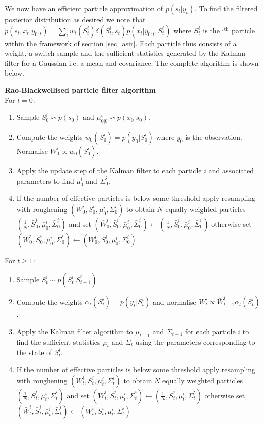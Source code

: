 We now have an efficient particle approximation of $p(s_t|y_t)$. To find the filtered posterior distribution as desired we note that $p(s_t,x_t|y_{0:t}) = \sum_i w_t(S_t^i)\delta(S_t^i, s_t)p(x_t|y_{0:t}, S_t^i)$ where $S_t^i$ is the i$^{\text{th}}$ particle within the framework of section \ref{sec_asir}. Each particle thus consists of a weight, a switch sample and the sufficient statistics generated by the Kalman filter for a Gaussian i.e. a mean and covariance. The complete algorithm is shown below.

\textbf{Rao-Blackwellised particle filter algorithm}\\
For $t=0$:
\begin{enumerate}
\item
Sample $S^i_0 \backsim p(s_0)$ and $\mu_{0|0}^i \backsim p(x_0|s_0)$.
\item
Compute the weights $w_0(S_0^i) = p(y_0|S_0^i)$ where $y_0$ is the observation. Normalise $W^i_0 \propto w_0(S^i_0)$.
\item
Apply the update step of the Kalman filter to each particle $i$ and associated parameters to find $\mu_0^i$ and $\Sigma_0^i$. 
\item
If the number of effective particles is below some threshold apply resampling with roughening $(W^i_0, {S}^i_0,{\mu}^i_0, {\Sigma}^i_0)$ to obtain $N$ equally weighted particles $(\frac{1}{N}, \bar{S}^i_0, \bar{\mu}^i_0, \bar{\Sigma}^i_0)$ and set $(\bar{W}^i_0, \bar{S}^i_0, \bar{\mu}^i_0, \bar{\Sigma}^i_0) \leftarrow (\frac{1}{N}, \bar{S}^i_0, \bar{\mu}^i_0, \bar{\Sigma}^i_0)$ otherwise set $(\bar{W}^i_0, \bar{S}^i_0, \bar{\mu}^i_0, \bar{\Sigma}^i_0) \leftarrow ({W}^i_0, {S}^i_0, \mu^i_0, \Sigma_0^i)$
\end{enumerate}
For $t \geq 1$:
\begin{enumerate}
\item
Sample $S^i_t \backsim p(S_t^i|\bar{S}^i_{t-1})$.
\item
Compute the weights $\alpha_t(S^i_{t}) = p(y_t|S_t^i)$ and normalise $W^i_t \propto \bar{W}^i_{t-1}\alpha_t(S^i_{t})$.
\item
Apply the Kalman filter algorithm to $\mu_{t-1}$ and $\Sigma_{t-1}$ for each particle $i$ to find the sufficient statistics $\mu_{t}$ and $\Sigma_{t}$ using the parameters corresponding to the state of $S^i_t$.
\item
If the number of effective particles is below some threshold apply resampling with roughening $(W^i_t, {S}^i_t,{\mu}^i_t, {\Sigma}^i_t)$ to obtain $N$ equally weighted particles $(\frac{1}{N}, \bar{S}^i_t, \bar{\mu}^i_t, \bar{\Sigma}^i_t)$ and set $(\bar{W}^i_t, \bar{S}^i_t, \bar{\mu}^i_t, \bar{\Sigma}^i_t) \leftarrow (\frac{1}{N}, \bar{S}^i_t, \bar{\mu}^i_t, \bar{\Sigma}^i_t)$ otherwise set $(\bar{W}^i_t, \bar{S}^i_t, \bar{\mu}^i_t, \bar{\Sigma}^i_t) \leftarrow ({W}^i_t, {S}^i_t, \mu^i_t, \Sigma_t^i)$
\end{enumerate} 

